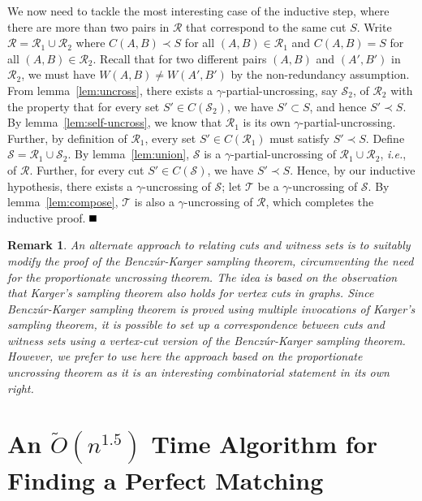 \documentclass[11pt]{article}
\newcommand{\qed}{\mbox{}\hspace*{\fill}\nolinebreak\mbox{$\rule{0.6em}{0.6em}$}
}
\newtheorem{remark}[theorem]{Remark}
\newenvironment{proofof}[1]{\noindent{\bf Proof of #1:}}{$\qed$\par}
\newcommand{\coll}{{\mathcal R}}
\newcommand{\colltwo}{{\mathcal T}}
\newcommand{\collpart}{{\mathcal S}}
\begin{document}
\begin{proofof}{Theorem~\ref{thm:uncross}}
  We now need to tackle the most interesting case of the inductive step, where
  there are more than two pairs in $\coll$ that correspond to the same cut
  $S$. Write $\coll = \coll_1 \cup \coll_2$ where $C(A,B) \prec S$ for all
  $(A,B) \in \coll_1$ and $C(A,B) = S$ for all $(A,B) \in \coll_2$. Recall
  that for two different pairs $(A,B)$ and $(A',B')$ in $\coll_2$, we must
  have $W(A,B) \neq W(A',B')$ by the non-redundancy assumption. From
  lemma~\ref{lem:uncross}, there exists a $\gamma$-partial-uncrossing, say
  $\collpart_2$, of $\coll_2$ with the property that for every set $S' \in
  C(\collpart_2)$, we have $S' \subset S$, and hence $S' \prec S$. By
  lemma~\ref{lem:self-uncross}, we know that $\coll_1$ is its own
  $\gamma$-partial-uncrossing. Further, by definition of $\coll_1$, every set
  $S' \in C(\coll_1)$ must satisfy $S' \prec S$. Define $\collpart = \coll_1
  \cup \collpart_2$. By lemma~\ref{lem:union}, $\collpart$ is a
  $\gamma$-partial-uncrossing of $\coll_1 \cup \coll_2$, {\em i.e.}, of
  $\coll$. Further, for every cut $S' \in C(\collpart)$, we have $S' \prec
  S$. Hence, by our inductive hypothesis, there exists a $\gamma$-uncrossing
  of $\collpart$; let $\colltwo$ be a $\gamma$-uncrossing of $\collpart$. By
  lemma~\ref{lem:compose}, $\colltwo$ is also a $\gamma$-uncrossing of
  $\coll$, which completes the inductive proof.
\end{proofof}

\begin{remark} \label{rm:other-approach}
An alternate approach to relating cuts and witness sets is to suitably
modify the proof of the
Bencz\'{u}r-Karger sampling theorem, circumventing the need for the
proportionate uncrossing
theorem. The idea is based on the observation that Karger's sampling
theorem also holds for
vertex cuts in graphs. Since Bencz\'{u}r-Karger sampling theorem is
proved using multiple
invocations of Karger's sampling theorem, it is possible to set up a
correspondence between
cuts and witness sets using a vertex-cut version of the
Bencz\'{u}r-Karger sampling theorem.
However, we prefer to use here the approach based on the proportionate
uncrossing theorem
as it is an interesting combinatorial statement in its own right.
\end{remark}


\section{An $\tilde{O}(n^{1.5})$ Time Algorithm for Finding a Perfect Matching}
\label{sec:algo}
\end{document}
